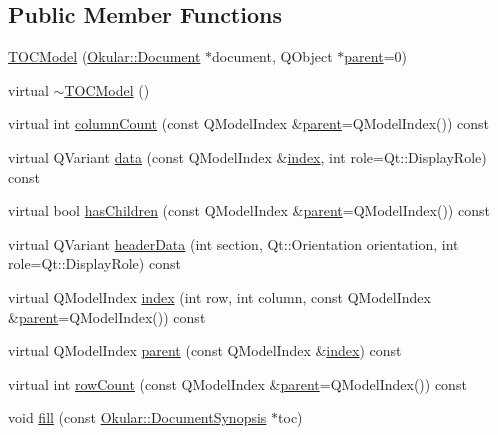 \subsection*{Public Member Functions}
\begin{DoxyCompactItemize}
\item 
\hyperlink{classTOCModel_a6f61504acf382dacf6ce891bd79a0c21}{T\+O\+C\+Model} (\hyperlink{classOkular_1_1Document}{Okular\+::\+Document} $\ast$document, Q\+Object $\ast$\hyperlink{classTOCModel_a98ec7547d9098d34115006d60f749207}{parent}=0)
\item 
virtual \hyperlink{classTOCModel_af7b0eff72a3bc512cfdc6b3e067e1c44}{$\sim$\+T\+O\+C\+Model} ()
\item 
virtual int \hyperlink{classTOCModel_abe6fc8f8ff7b8b1555978213eed885fc}{column\+Count} (const Q\+Model\+Index \&\hyperlink{classTOCModel_a98ec7547d9098d34115006d60f749207}{parent}=Q\+Model\+Index()) const 
\item 
virtual Q\+Variant \hyperlink{classTOCModel_a87dcfc9c6da7a211a78467031258daab}{data} (const Q\+Model\+Index \&\hyperlink{classTOCModel_a2ad29438ae7eb6c3085eeeb6cbe6d74d}{index}, int role=Qt\+::\+Display\+Role) const 
\item 
virtual bool \hyperlink{classTOCModel_a77759582df0f4ce7df4e5c968a69dafa}{has\+Children} (const Q\+Model\+Index \&\hyperlink{classTOCModel_a98ec7547d9098d34115006d60f749207}{parent}=Q\+Model\+Index()) const 
\item 
virtual Q\+Variant \hyperlink{classTOCModel_a5527fb6256956061df8aa98743822699}{header\+Data} (int section, Qt\+::\+Orientation orientation, int role=Qt\+::\+Display\+Role) const 
\item 
virtual Q\+Model\+Index \hyperlink{classTOCModel_a2ad29438ae7eb6c3085eeeb6cbe6d74d}{index} (int row, int column, const Q\+Model\+Index \&\hyperlink{classTOCModel_a98ec7547d9098d34115006d60f749207}{parent}=Q\+Model\+Index()) const 
\item 
virtual Q\+Model\+Index \hyperlink{classTOCModel_a98ec7547d9098d34115006d60f749207}{parent} (const Q\+Model\+Index \&\hyperlink{classTOCModel_a2ad29438ae7eb6c3085eeeb6cbe6d74d}{index}) const 
\item 
virtual int \hyperlink{classTOCModel_a5f7f5c77822891d195407b24c140207f}{row\+Count} (const Q\+Model\+Index \&\hyperlink{classTOCModel_a98ec7547d9098d34115006d60f749207}{parent}=Q\+Model\+Index()) const 
\item 
void \hyperlink{classTOCModel_a9c2336a41645593a2630dde4d2667425}{fill} (const \hyperlink{classOkular_1_1DocumentSynopsis}{Okular\+::\+Document\+Synopsis} $\ast$toc)

\end{DoxyCompactItemize}
